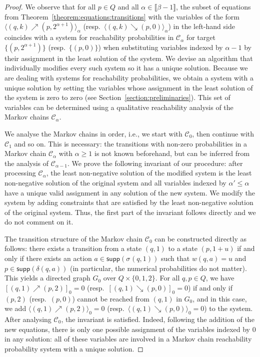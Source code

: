 \documentclass[a4paper,UKenglish,cleveref,autoref,thm-restate,colorlinks]{lipics-v2021}
\newcommand{\integerInterval}[1]{\llbracket{}#1\rrbracket{}}
\newcommand{\supp}[1]{\mathsf{supp}(#1)}
\newcommand{\graph}{G}
\newcommand{\weight}{w}
\newcommand{\weightVal}{u}
\newcommand{\ocStateSpace}{Q}
\newcommand{\ocState}{q}
\newcommand{\ocStateB}{p}
\newcommand{\ocCount}{k}
\newcommand{\ocAction}{a}
\newcommand{\ocTrans}{\delta}
\newcommand{\mchain}{\mathcal{C}}
\newcommand{\powerIndex}{\alpha}
\newcommand{\powerMax}{\beta}
\newcommand{\upProba}[5]{[(#1,#2)\nearrow{}(#3,#4)]_{#5}}
\newcommand{\downProba}[5]{[(#1,#2)\searrow{}(#3,#4)]_{#5}}
\newcommand{\upProbaVar}[5]{\langle (#1,#2)\nearrow{}(#3,#4)\rangle_{#5}}
\newcommand{\downProbaVar}[5]{\langle (#1,#2)\searrow{}(#3,#4)\rangle_{#5}}
\newcommand{\stratGeneric}[1]{{\sigma_{#1}}}
\newcommand{\strat}{\stratGeneric{}}
\begin{document}
\begin{proof}
  We observe that for all $\ocStateB\in\ocStateSpace$ and all $\powerIndex\in\integerInterval{\powerMax-1}$, the subset of equations from Theorem~\ref{theorem:equations:transitions} with the variables of the form $\upProbaVar{\ocState}{\ocCount}{\ocStateB}{2^{\powerIndex+1}}{\powerIndex}$ (resp.~$\downProbaVar{\ocState}{\ocCount}{\ocStateB}{0}{\powerIndex}$) in the left-hand side coincides with a system for reachability probabilities in $\mchain_\powerIndex$ for target $\{(\ocStateB, 2^{\powerIndex+1})\}$ (resp.~$\{(\ocStateB, 0)\}$) when substituting variables indexed by $\powerIndex-1$ by their assignment in the least solution of the system.
  We devise an algorithm that individually modifies every such system so it has a unique solution.
  Because we are dealing with systems for reachability probabilities, we obtain a system with a unique solution by setting the variables whose assignment in the least solution of the system is zero to zero (see Section~\ref{section:preliminaries}).
  This set of variables can be determined using a qualitative reachability analysis of the Markov chains $\mchain_\powerIndex$.

  We analyse the Markov chains in order, i.e., we start with $\mchain_0$, then continue with $\mchain_1$ and so on.
  This is necessary: the transitions with non-zero probabilities in a Markov chain $\mchain_\powerIndex$ with $\powerIndex\geq 1$ is not known beforehand, but can be inferred from the analysis of $\mchain_{\powerIndex-1}$.
  We prove the following invariant of our procedure: after processing $\mchain_\powerIndex$, the least non-negative solution of the modified system is the least non-negative solution of the original system and all variables indexed by $\powerIndex'\leq\powerIndex$ have a unique valid assignment in any solution of the new system.
  We modify the system by adding constraints that are satisfied by the least non-negative solution of the original system.
  Thus, the first part of the invariant follows directly and we do not comment on it.
  
  The transition structure of the Markov chain $\mchain_0$ can be constructed directly as follows: there exists a transition from a state $(\ocState, 1)$ to a state $(\ocStateB, 1+\weightVal)$ if and only if there exists an action $\ocAction\in\supp{\strat(\ocState, 1)}$ such that $\weight(\ocState, \ocAction)=\weightVal$ and $\ocStateB\in\supp{\ocTrans(\ocState, \ocAction)}$ (in particular, the numerical probabilities do not matter).
  This yields a directed graph $\graph_0$ over $\ocStateSpace\times\{0, 1, 2\}$.
  For all $\ocState, \ocStateB\in\ocStateSpace$, we have $\upProba{\ocState}{1}{\ocStateB}{2}{0}=0$ (resp.~$\downProba{\ocState}{1}{\ocStateB}{0}{0}=0$) if and only if $(\ocStateB, 2)$ (resp.~$(\ocStateB, 0)$) cannot be reached from $(\ocState, 1)$ in $\graph_0$, and in this case, we add $\upProbaVar{\ocState}{1}{\ocStateB}{2}{0}=0$ (resp.~$\downProbaVar{\ocState}{1}{\ocStateB}{0}{0}=0$) to the system.
  After analysing $\mchain_0$, the invariant is satisfied.
  Indeed, following the addition of the new equations, there is only one possible assignment of the variables indexed by $0$ in any solution: all of these variables are involved in a Markov chain reachability probability system with a unique solution.


\end{proof}
\end{document}
